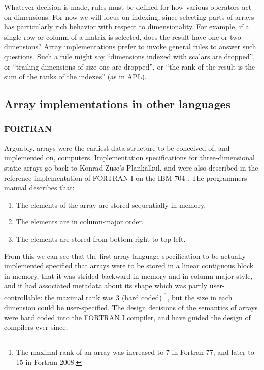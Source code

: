 \documentclass[preprint]{sigplanconf}
\begin{document}

Whatever decision is made, rules must be defined for how various operators act
on dimensions. For now we will focus on indexing, since selecting parts of
arrays has particularly rich behavior with respect to dimensionality. For
example, if a single row or column of a matrix is selected, does the result
have one or two dimensions? Array implementations prefer to invoke general
rules to answer such questions. Such a rule might say ``dimensions indexed
with scalars are dropped'', or ``trailing dimensions of size one are
dropped'', or ``the rank of the result is the sum of the ranks of the
indexes'' (as in APL).

\subsection{Array implementations in other languages}

\subsubsection{FORTRAN}

Arguably, arrays were the earliest data structure to be conceived of, and
implemented on, computers. Implementation specifications for three-dimensional
static arrays go back to Konrad Zuse's Plankalk\"ul, and were also described
in the reference implementation of FORTRAN I on the IBM 704
\cite{Backus:1957fa}. The programmers manual \cite[pp.~10--11]{Backus:1956pr}
describes that:


\begin{enumerate}
\item The elements of the array are stored sequentially in memory.
\item The elements are in column-major order.
\item The elements are stored from bottom right to top left.
\end{enumerate}

From this we can see that the first array language specification to be
actually implemented specified that arrays were to be stored in a linear
contiguous block in memory, that it was strided backward in memory and in
column major style, and it had associated metadata about its shape which was
partly user-controllable: the maximal rank was 3 (hard coded) \footnote{The
maximal rank of an array was increased to 7 in Fortran 77, and later to 15 in
Fortran 2008.}, but the size in each dimension could be user-specified. The
design decisions of the semantics of arrays were hard coded into the FORTRAN I
compiler, and have guided the design of compilers ever since.
\end{document}

